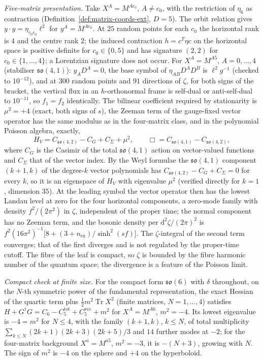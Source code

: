 \emph{Five-matrix presentation.} Take \(X^A=M^{Ac_0}\), \(A\ne c_0\), with the restriction of \(\eta_6\) as contraction (Definition~\ref{def:matrix-coords-ext}, \(D=5\)). The orbit relation gives \(y\cdot y=\eta_{c_0c_0}\ell^2\) for \(y^A=M^{Ac_0}\). At \(25\) random points for each \(c_0\) the horizontal rank is \(4\) and the centre rank \(2\); the induced contraction \(h=c^{T}\eta c\) on the horizontal space is positive definite for \(c_0\in\{0,5\}\) and has signature \((2,2)\) for \(c_0\in\{1,\dots,4\}\); a Lorentzian signature does not occur. For \(X^A=M^{A5}\), \(A=0,\dots,4\) (stabiliser \(\mathfrak{so}(4,1)\)): \(y_AD^A=0\), the base symbol of \(\eta_{AB}D^AD^B\) is \(\ell^2g^{-1}\) (checked to \(10^{-12}\)), and at \(300\) random points and \(91\) directions of \(\zeta\), for both signs of the bracket, the vertical flux in an \(h\)-orthonormal frame is self-dual or anti-self-dual to \(10^{-11}\), so \(f_1=f_2\) identically. The bilinear coefficient required by stationarity is \(\mu^2=+4\) (exact, both signs of \(s\)), the Zeeman term of the gauge-fixed vector operator has the same modulus as in the four-matrix class, and in the polynomial Poisson algebra, exactly,
\[
H_V=C_{\mathfrak{so}(4,2)}-C_{G}+C_{\Sigma}+\mu^2,\qquad \Box=C_{\mathfrak{so}(4,1)}-C_{\mathfrak{so}(4,2)},
\]
where \(C_G\) is the Casimir of the total \(\mathfrak{so}(4,1)\) action on vector-valued functions and \(C_\Sigma\) that of the vector index. By the Weyl formulae the \(\mathfrak{so}(4,1)\) component \((k+1,k)\) of the degree-\(k\) vector polynomials has \(C_{\mathfrak{so}(4,2)}-C_G+C_\Sigma=0\) for every \(k\), so it is an eigenspace of \(H_V\) with eigenvalue \(\mu^2\) (verified directly for \(k=1\), dimension \(35\)). At the leading symbol the vector operator then has the lowest Landau level at zero for the four horizontal components, a zero-mode family with density \(f^2/(2\pi^2)\) in \(\zeta\), independent of the proper time; the normal component has no Zeeman term, and the bosonic density per \(\mathrm d^2\zeta/(2\pi)^2\) is \(f^2(16\pi^2)^{-1}\bigl[8+(3+n_{\mathrm{ex}})/\sinh^2(sf)\bigr]\). The \(\zeta\)-integral of the second term converges; that of the first diverges and is not regulated by the proper-time cutoff. The fibre of the leaf is compact, so \(\zeta\) is bounded by the fibre harmonic number of the quantum space; the divergence is a feature of the Poisson limit.

\emph{Compact check at finite size.} For the compact form \(\mathfrak{so}(6)\) with \(\delta\) throughout, on the \(N\)-th symmetric power of the fundamental representation, the exact Hessian of the quartic term plus \(\tfrac12m^2\operatorname{Tr}X^2\) (finite matrices, \(N=1,\dots,4\)) satisfies \(H+G^\dagger G=C_6-C_5^{\mathrm{tot}}+C_5^{\mathrm{vec}}+m^2\) for \(X^A=M^{A6}\), \(m^2=-4\). Its lowest eigenvalue is \(-4=m^2\) for \(N\le4\), with the family \((k+1,k)\), \(k\le N\), of total multiplicity \(\sum_{k\le N}(2k+1)(2k+3)(2k+5)/3\) and \(14\) further modes at \(-2\); for the four-matrix background \(X^a=M^{a5}\), \(m^2=-3\), it is \(-(N+3)\), growing with \(N\). The sign of \(m^2\) is \(-4\) on the sphere and \(+4\) on the hyperboloid.

